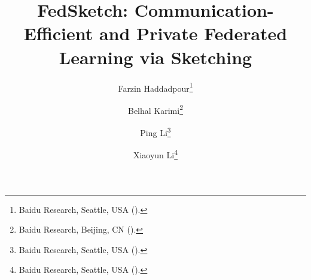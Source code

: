 

\usepackage{lipsum}
\usepackage{amsfonts}
\usepackage{graphicx}
\usepackage{epstopdf}
\usepackage{algorithmic}
\ifpdf
\else
\fi

\newcommand{\creflastconjunction}{, and~}



\title{FedSketch: Communication-Efficient and Private Federated Learning via Sketching}

\author{Farzin Haddadpour\thanks{Baidu Research, Seattle, USA 
  ().}
\and Belhal Karimi\thanks{Baidu Research, Beijing, CN 
  ().}
   \and Ping Li\thanks{Baidu Research, Seattle, USA 
  ().}
\and Xiaoyun Li\thanks{Baidu Research, Seattle, USA 
  ().}
  }

\usepackage{amsopn}
\DeclareMathOperator{\diag}{diag}


